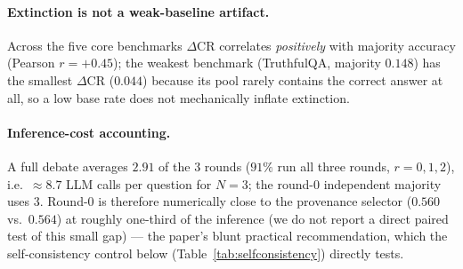 \paragraph{Extinction is not a weak-baseline artifact.}
Across the five core benchmarks $\Delta\mathrm{CR}$ correlates \emph{positively} with majority accuracy
(Pearson $r=+0.45$); the weakest benchmark (TruthfulQA, majority $0.148$) has the smallest $\Delta\mathrm{CR}$
($0.044$) because its pool rarely contains the correct answer at all, so a low base rate does not mechanically
inflate extinction.

\paragraph{Inference-cost accounting.}
A full debate averages $2.91$ of the $3$ rounds ($91\%$ run all three rounds, $r{=}0,1,2$), i.e.\ $\approx\!8.7$ LLM calls per
question for $N=3$; the round-$0$ independent majority uses $3$. Round-$0$ is therefore numerically close to
the provenance selector ($0.560$ vs.\ $0.564$) at roughly one-third of the inference (we do not report a
direct paired test of this small gap) --- the paper's blunt practical recommendation, which the
self-consistency control below (Table~\ref{tab:selfconsistency}) directly tests.

